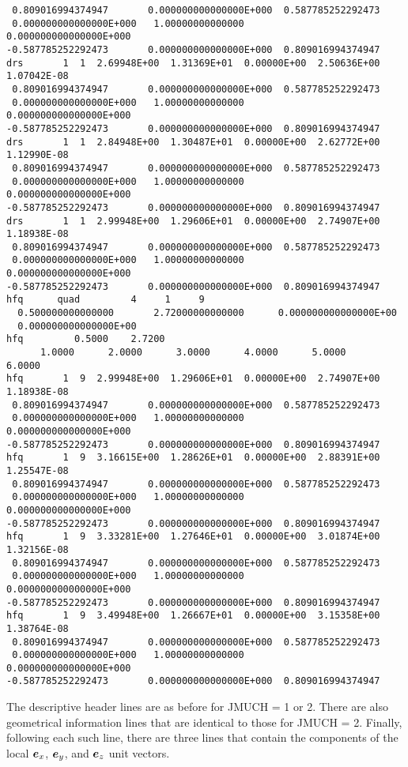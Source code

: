 \begin{footnotesize}
\begin{verbatim}
 0.809016994374947       0.000000000000000E+000  0.587785252292473
 0.000000000000000E+000   1.00000000000000       0.000000000000000E+000
-0.587785252292473       0.000000000000000E+000  0.809016994374947
drs       1  1  2.69948E+00  1.31369E+01  0.00000E+00  2.50636E+00  1.07042E-08
 0.809016994374947       0.000000000000000E+000  0.587785252292473
 0.000000000000000E+000   1.00000000000000       0.000000000000000E+000
-0.587785252292473       0.000000000000000E+000  0.809016994374947
drs       1  1  2.84948E+00  1.30487E+01  0.00000E+00  2.62772E+00  1.12990E-08
 0.809016994374947       0.000000000000000E+000  0.587785252292473
 0.000000000000000E+000   1.00000000000000       0.000000000000000E+000
-0.587785252292473       0.000000000000000E+000  0.809016994374947
drs       1  1  2.99948E+00  1.29606E+01  0.00000E+00  2.74907E+00  1.18938E-08
 0.809016994374947       0.000000000000000E+000  0.587785252292473
 0.000000000000000E+000   1.00000000000000       0.000000000000000E+000
-0.587785252292473       0.000000000000000E+000  0.809016994374947
hfq      quad         4     1     9
  0.500000000000000       2.72000000000000      0.000000000000000E+00
  0.000000000000000E+00
hfq         0.5000    2.7200
      1.0000      2.0000      3.0000      4.0000      5.0000      6.0000
hfq       1  9  2.99948E+00  1.29606E+01  0.00000E+00  2.74907E+00  1.18938E-08
 0.809016994374947       0.000000000000000E+000  0.587785252292473
 0.000000000000000E+000   1.00000000000000       0.000000000000000E+000
-0.587785252292473       0.000000000000000E+000  0.809016994374947
hfq       1  9  3.16615E+00  1.28626E+01  0.00000E+00  2.88391E+00  1.25547E-08
 0.809016994374947       0.000000000000000E+000  0.587785252292473
 0.000000000000000E+000   1.00000000000000       0.000000000000000E+000
-0.587785252292473       0.000000000000000E+000  0.809016994374947
hfq       1  9  3.33281E+00  1.27646E+01  0.00000E+00  3.01874E+00  1.32156E-08
 0.809016994374947       0.000000000000000E+000  0.587785252292473
 0.000000000000000E+000   1.00000000000000       0.000000000000000E+000
-0.587785252292473       0.000000000000000E+000  0.809016994374947
hfq       1  9  3.49948E+00  1.26667E+01  0.00000E+00  3.15358E+00  1.38764E-08
 0.809016994374947       0.000000000000000E+000  0.587785252292473
 0.000000000000000E+000   1.00000000000000       0.000000000000000E+000
-0.587785252292473       0.000000000000000E+000  0.809016994374947
\end{verbatim}
\end{footnotesize}

\noindent The descriptive header lines are as before for JMUCH = 1 or 2.  There
are also geometrical information lines that are identical to those for
JMUCH = 2.  Finally, following each such line, there are three lines that
contain the components of the local $\mbox{\boldmath $e$}_x$,
$\mbox{\boldmath $e$}_y$, and $\mbox{\boldmath $e$}_z$ unit vectors.

